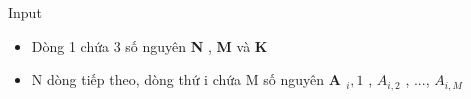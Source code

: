 Input  
\begin{itemize}
	\item     Dòng 1 chứa 3 số nguyên    \textbf{     N    }    ,    \textbf{     M    }    và    \textbf{     K    }
	\item     N dòng tiếp theo, dòng thứ i chứa M số nguyên    \textbf{     A     $_      i, 1     $}    ,    \textbf{     $A_{i,2}$}    , ...,    \textbf{     $A_{i,M}$}
\end{itemize}